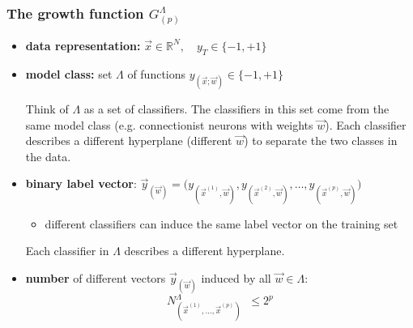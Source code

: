 \begin{frame} \frametitle{The growth function $G_{(p)}^\Lambda$}
	\begin{itemize}
		\item<1-> \textbf{data representation:} 
			$\vec{x} \in \mathbb{R}^N, \quad y_T \in \{-1,+1\}$ 
		\vspace{5mm}
		\item<1-> \textbf{model class:} 
			set $\Lambda$ of functions $y_{(\vec{x}; \vec{w})} \in \{-1,+1\}$
			
			Think of $\Lambda$ as a set of classifiers.
			The classifiers in this set come from the same model class (e.g. connectionist neurons with weights $\vec w$).
			Each classifier describes a different hyperplane (different $\vec w$) to separate the two classes in the data.
			
		\vspace{3mm}
		\item<2-> {\textbf{binary label vector}:} $\vec y_{(\vec{w})} = \Big( 
			y_{(\vec{x}^{(1)}, \vec{w})}, 
			y_{(\vec{x}^{(2)}, \vec{w})}, \ldots, 
			y_{(\vec{x}^{(p)}, \vec{w})} \Big)$
			\begin{itemize}	
				\item different classifiers can induce the 
					same label vector on the training set
			\end{itemize}
			
			Each classifier in $\Lambda$ describes a different hyperplane.
		\vspace{5mm}
		\item<3> \textbf{number} of different vectors $\vec y_{(\vec{w})}$ 
			induced by all $\vec w \in \Lambda$:
			\vspace{-2mm}
			\begin{equation}
				\tag{depends on $\Lambda$ and the sample}
				N_{(\vec{x}^{(1)}, \ldots, \vec{x}^{(p)})}^\Lambda 
				\;\;\leq 2^p 
			\end{equation}
	\end{itemize}
\end{frame}

